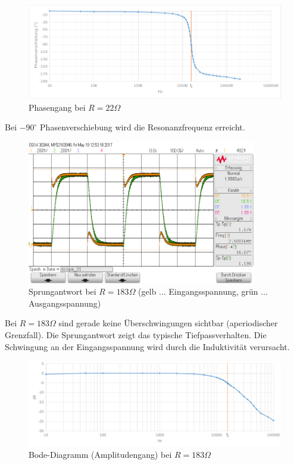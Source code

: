 \documentclass[12pt,a4paper,titlepage]{article}
\begin{document}
\begin{figure}[H]
  \centering
  \includegraphics[width=150mm]{phasengang_rlc_22.png}
  \caption{Phasengang bei $R=22\Omega$}
\end{figure}

\noindent Bei $-90^{\circ}$ Phasenverschiebung wird die Resonanzfrequenz erreicht.

\begin{figure}[H]
  \centering
  \includegraphics[width=100mm]{sprungantwort_rlc_180.png}
  \caption{Sprungantwort bei $R=183\Omega$ (gelb $\hdots$ Eingangsspannung, gr\"un $\hdots$ Ausgangsspannung)}
\end{figure}
\noindent Bei $R=183\Omega$ sind gerade keine \"Uberschwingungen sichtbar (aperiodischer Grenzfall). Die Sprungantwort zeigt das typische Tiefpassverhalten. Die Schwingung an der Eingangsspannung wird durch die Induktivit\"at verursacht.

\begin{figure}[H]
  \centering
  \includegraphics[width=150mm]{bode_rlc_180.png}
  \caption{Bode-Diagramm (Amplitudengang) bei $R=183\Omega$}
\end{figure}
\end{document}
